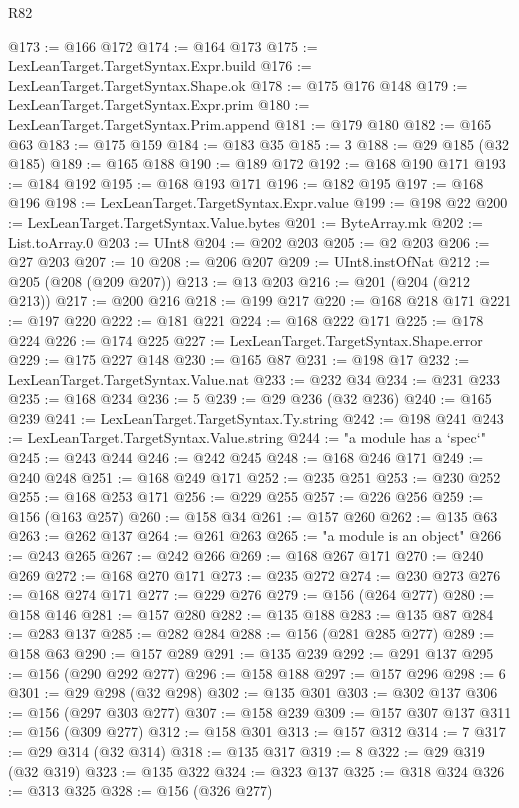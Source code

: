 \begin{lexlean}{R82}
\begin{coremodule}
@173 := @166 @172
@174 := @164 @173
@175 := LexLeanTarget.TargetSyntax.Expr.build
@176 := LexLeanTarget.TargetSyntax.Shape.ok
@178 := @175 @176 @148
@179 := LexLeanTarget.TargetSyntax.Expr.prim
@180 := LexLeanTarget.TargetSyntax.Prim.append
@181 := @179 @180
@182 := @165 @63
@183 := @175 @159
@184 := @183 @35
@185 := 3
@188 := @29 @185 (@32 @185)
@189 := @165 @188
@190 := @189 @172
@192 := @168 @190 @171
@193 := @184 @192
@195 := @168 @193 @171
@196 := @182 @195
@197 := @168 @196
@198 := LexLeanTarget.TargetSyntax.Expr.value
@199 := @198 @22
@200 := LexLeanTarget.TargetSyntax.Value.bytes
@201 := ByteArray.mk
@202 := List.toArray.{0}
@203 := UInt8
@204 := @202 @203
@205 := @2 @203
@206 := @27 @203
@207 := 10
@208 := @206 @207
@209 := UInt8.instOfNat
@212 := @205 (@208 (@209 @207))
@213 := @13 @203
@216 := @201 (@204 (@212 @213))
@217 := @200 @216
@218 := @199 @217
@220 := @168 @218 @171
@221 := @197 @220
@222 := @181 @221
@224 := @168 @222 @171
@225 := @178 @224
@226 := @174 @225
@227 := LexLeanTarget.TargetSyntax.Shape.error
@229 := @175 @227 @148
@230 := @165 @87
@231 := @198 @17
@232 := LexLeanTarget.TargetSyntax.Value.nat
@233 := @232 @34
@234 := @231 @233
@235 := @168 @234
@236 := 5
@239 := @29 @236 (@32 @236)
@240 := @165 @239
@241 := LexLeanTarget.TargetSyntax.Ty.string
@242 := @198 @241
@243 := LexLeanTarget.TargetSyntax.Value.string
@244 := "a module has a `spec`"
@245 := @243 @244
@246 := @242 @245
@248 := @168 @246 @171
@249 := @240 @248
@251 := @168 @249 @171
@252 := @235 @251
@253 := @230 @252
@255 := @168 @253 @171
@256 := @229 @255
@257 := @226 @256
@259 := @156 (@163 @257)
@260 := @158 @34
@261 := @157 @260
@262 := @135 @63
@263 := @262 @137
@264 := @261 @263
@265 := "a module is an object"
@266 := @243 @265
@267 := @242 @266
@269 := @168 @267 @171
@270 := @240 @269
@272 := @168 @270 @171
@273 := @235 @272
@274 := @230 @273
@276 := @168 @274 @171
@277 := @229 @276
@279 := @156 (@264 @277)
@280 := @158 @146
@281 := @157 @280
@282 := @135 @188
@283 := @135 @87
@284 := @283 @137
@285 := @282 @284
@288 := @156 (@281 @285 @277)
@289 := @158 @63
@290 := @157 @289
@291 := @135 @239
@292 := @291 @137
@295 := @156 (@290 @292 @277)
@296 := @158 @188
@297 := @157 @296
@298 := 6
@301 := @29 @298 (@32 @298)
@302 := @135 @301
@303 := @302 @137
@306 := @156 (@297 @303 @277)
@307 := @158 @239
@309 := @157 @307 @137
@311 := @156 (@309 @277)
@312 := @158 @301
@313 := @157 @312
@314 := 7
@317 := @29 @314 (@32 @314)
@318 := @135 @317
@319 := 8
@322 := @29 @319 (@32 @319)
@323 := @135 @322
@324 := @323 @137
@325 := @318 @324
@326 := @313 @325
@328 := @156 (@326 @277)

\end{coremodule}
\end{lexlean}
